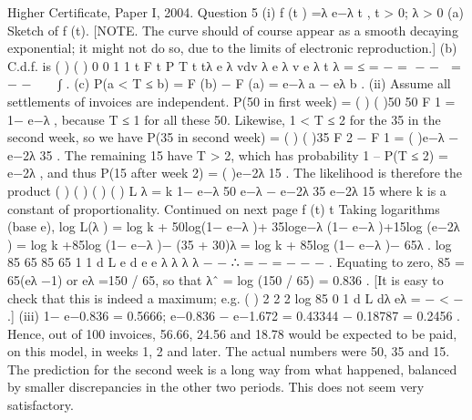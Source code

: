 Higher Certificate, Paper I, 2004. Question 5
(i) f (t ) =λ e−λ t , t > 0; λ > 0
(a) Sketch of f (t).
[NOTE. The curve should of course appear as a smooth decaying exponential;
it might not do so, due to the limits of electronic reproduction.]
(b) C.d.f. is ( ) ( ) 0
0
1 1
t
F t P T t tλ e λ vdv λ e λ v e λ t
λ
= ≤ = − = − −  = − −   ∫ .
(c) P(a < T ≤ b) = F (b) − F (a) = e−λ a − eλ b .
(ii) Assume all settlements of invoices are independent.
P(50 in first week) = { ( )} ( )50 50 F 1 = 1− e−λ , because T ≤ 1 for all these 50.
Likewise, 1 < T ≤ 2 for the 35 in the second week, so we have P(35 in second week) =
{ ( ) ( )}35 F 2 − F 1 = ( )e−λ − e−2λ 35 .
The remaining 15 have T > 2, which has probability 1 – P(T ≤ 2) = e−2λ , and thus
P(15 after week 2) = ( )e−2λ 15 .
The likelihood is therefore the product
( ) ( ) ( ) ( ) L λ = k 1− e−λ 50 e−λ − e−2λ 35 e−2λ 15
where k is a constant of proportionality.
Continued on next page
f (t)
t
Taking logarithms (base e),
log L(λ ) = log k + 50log(1− e−λ )+ 35log{e−λ (1− e−λ )}+15log (e−2λ )
= log k +85log (1− e−λ )− (35 + 30)λ = log k + 85log (1− e−λ )− 65λ .
log 85 65 85 65
1 1
d L e
d e e
λ
λ λ λ
−
− ∴ = − = −
− −
.
Equating to zero, 85 = 65(eλ −1) or eλ =150 / 65, so that λˆ = log (150 / 65) = 0.836 .
[It is easy to check that this is indeed a maximum; e.g. ( )
2
2 2
log 85 0
1
d L
dλ eλ
= − <
−
.]
(iii) 1− e−0.836 = 0.5666; e−0.836 − e−1.672 = 0.43344 − 0.18787 = 0.2456 . Hence, out
of 100 invoices, 56.66, 24.56 and 18.78 would be expected to be paid, on this model,
in weeks 1, 2 and later. The actual numbers were 50, 35 and 15. The prediction for
the second week is a long way from what happened, balanced by smaller
discrepancies in the other two periods. This does not seem very satisfactory.
